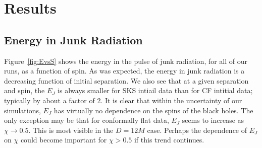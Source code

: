 





\section{Results}
\label{sec:Results}




\subsection{Energy in Junk Radiation}

Figure~\ref{fig:EvsS} shows the energy in the pulse of junk radiation,
for all of our runs, as a function of spin. As was expected, the
energy in junk radiation is a decreasing function of initial
separation. We also see that at a given separation and spin, the $E_J$
is always smaller for SKS intiail data than for CF intitial data;
typically by about a factor of 2. It is clear that within
the uncertainty of our simulations, $E_J$ has virtually no dependence
on the spins of the black holes. The only exception may be that for
conformally flat data, $E_J$ seems to increase as $\chi\rightarrow
0.5$. This is most visible in the $D=12M$ case. Perhaps the dependence
of $E_J$ on $\chi$ could become important for $\chi > 0.5$ if this
trend continues.

